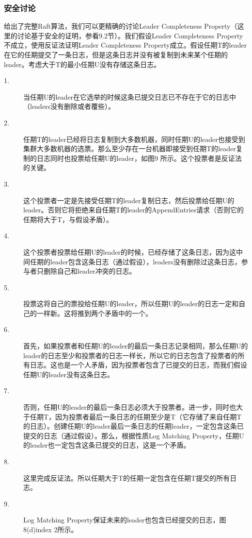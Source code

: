 \documentclass[journal]{IEEEtran}
\begin{document}
\subsubsection{安全讨论}

给出了完整Raft算法，我们可以更精确的讨论Leader Completeness Property（这里的讨论基于安全的证明，参看9.2节）。我们假设Leader Completeness Property不成立，使用反证法证明Leader Completeness Property成立。假设任期T的leader在它的任期提交了一条日志，但是这条日志并没有被复制到未来某个任期的leader。考虑大于T的最小任期U没有存储这条日志。

\begin{description}
\item[1.]当任期U的leader在它选举的时候这条已提交日志已不存在于它的日志中（leaders没有删除或者覆些）。
\item[2.]任期T的leader已经将日志复制到大多数机器，同时任期U的leader也接受到集群大多数机器的选票。那么至少存在一台机器即接受到任期T的leader复制的日志同时也投票给任期U的leader，如图9
所示。这个投票者是反证法的关键。
\item[3.]这个投票者一定是先接受任期T的leader复制日志，然后投票给任期U的leader。否则它将拒绝来自任期T的leader的AppendEntries请求（否则它的任期将大于T，与假设矛盾）。
\item[4.]这个投票者投票给任期U的leader的时候，已经存储了这条日志，因为这中间任期的leader包含这条日志（通过假设），leaders没有删除过这条日志，参与者只删除自己和leader冲突的日志。
\item[5.]投票这将自己的票投给任期U的leader，所以任期U的leader的日志一定和自己的一样新。这将推到两个矛盾中的一个。
\item[6.]首先，如果投票者和任期U的leader的最后一条日志记录相同，那么任期U的leader的日志至少和投票者的日志一样长，所以它的日志包含了投票者的所有日志。这也是一个人矛盾，因为投票者包含了已提交的日志，而我们假设任期U的leader没有这条日志。
\item[7.]否则，任期U的leader的最后一条日志必须大于投票者。进一步，同时也大于任期T，因为投票者最后一条日志的任期至少是T（它存储了来自任期T的日志）。创建任期U的leader最后一条日志的任期leader，一定包含这条已提交的日志（通过假设）。那么，根据性质Log Matching Property，任期U的leader也一定包含这条已提交的日志，这是一个矛盾。
\item[8.]这里完成反证法。所以任期大于T的任期一定包含在任期T提交的所有日志。
\item[9.]Log Matching Property保证未来的leader也包含已经提交的日志，图8(d)index 2所示。
\end{description}
\end{document}
